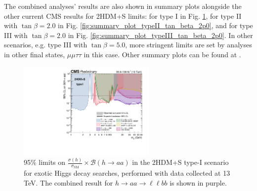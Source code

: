 The combined analyses' results are also shown in summary plots alongside the other current CMS results for 2HDM+S limits: for type I in Fig. \ref{fig:summary_plot_type_I}, for type II with $\tan\beta = 2.0$ in Fig. \ref{fig:summary_plot_typeII_tan_beta_2p0}, and for type III with $\tan\beta = 2.0$ in Fig. \ref{fig:summary_plot_typeIII_tan_beta_2p0}. In other scenarios, e.g. type III with $\tan\beta = 5.0$, more stringent limits are set by analyses in other final states, $\mu\mu\tau\tau$ in this case. Other summary plots can be found at \cite{twiki_2HDM+S_summary-plots}.

\begin{figure}[h]
    \begin{center}
      \includegraphics[width=0.6\textwidth]{figures/ch-10-results/summary_plot_full_run2_plot_BRaa_Type1.pdf}
    \end{center}
    \caption[95\% limits on $\frac{\sigma(h)}{\sigma_{\text{SM}}} \times \mathcal{B}(h \rightarrow aa)$ in the 2HDM+S type-I scenario for exotic Higgs decay searches, performed with data collected at 13 TeV.]{95\% limits on $\frac{\sigma(h)}{\sigma_{\text{SM}}} \times \mathcal{B}(h \rightarrow aa)$ in the 2HDM+S type-I scenario for exotic Higgs decay searches, performed with data collected at 13 TeV. The combined result for $h\rightarrow aa \rightarrow \ell\ell bb$ \cite{CMS-HIG-22-007} is shown in purple.}
      \label{fig:summary_plot_type_I}
  \end{figure}
